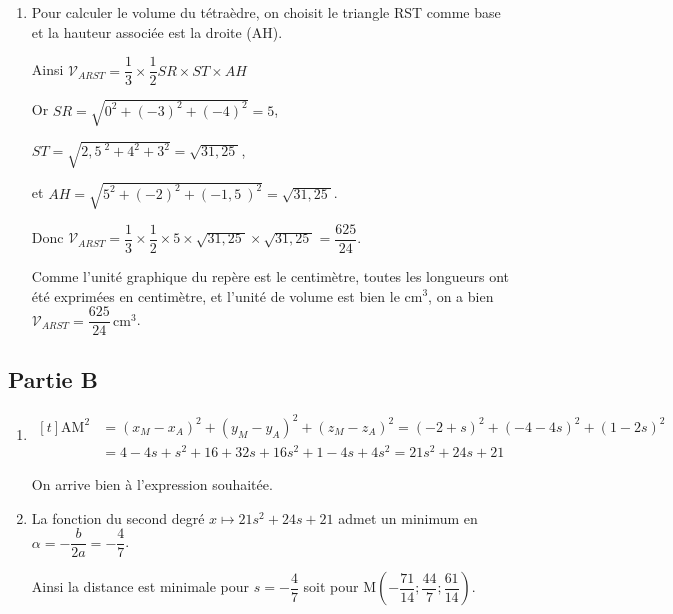 \documentclass[10pt]{article}
\providecommand{\vectt}[1]{\overrightarrow{\mathrm{#1}}}
\providecommand{\np}[2][]{{#2~#1}}
\begin{document}
\begin{enumerate}
\begin{enumerate}
			Les vecteurs $\vectt{SR}$ et $\vectt{ST}$ sont orthogonaux donc les droites (SR) et (ST) sont orthogonale (et perpendiculaires, car sécantes en S) et le triangle RST est rectangle en S.

			\item Pour calculer le volume du tétraèdre, on choisit le triangle RST comme base et la hauteur associée est la droite (AH).

			Ainsi \quad $\mathcal{V}_{ARST} = \dfrac{1}{3} \times \dfrac{1}{2} SR \times ST \times AH$

			Or \quad  $SR=\sqrt{0^2+(-3)^2+(-4)^2}=5$,

			$ST=\sqrt{\np{2,5}^2+4^2+3^2}=\sqrt{\np{31,25}}$,

			et \quad $AH=\sqrt{5^2+(-2)^2+(-\np{1,5})^2}=\sqrt{\np{31,25}}$.

			Donc \quad $\mathcal{V}_{ARST} = \dfrac{1}{3} \times \dfrac{1}{2} \times 5 \times \sqrt{\np{31,25}} \times \sqrt{\np{31,25}}=\dfrac{625}{24}$.

			Comme l'unité graphique du repère est le centimètre, toutes les longueurs ont été exprimées en centimètre, et l'unité de volume est bien le cm$^3$, on a bien $\mathcal{V}_{ARST} = \dfrac{625}{24} \,\text{cm}^3$.
		\end{enumerate}
	\end{enumerate}

	\subsection*{Partie B}

	\begin{enumerate}
		\item $\begin{aligned}[t]
			\mathrm{AM}^2&=\left(x_M-x_A \right)^2+\left(y_M-y_A \right)^2+\left(z_M-z_A \right)^2
		=( -2+s)^2+(-4-4s)^2+(1-2s)^2\\
		&=4-4s+s^2+16+32s+16s^2+1-4s+4s^2
		=21s^2+24s+21
		\end{aligned}$

		On arrive bien à l'expression souhaitée.

		\item La fonction du second degré \quad $x \longmapsto 21s^2+24s+21$ \quad admet un minimum en \quad $\alpha = -\dfrac{b}{2a}=-\dfrac{4}{7}$.

		Ainsi la distance est minimale pour \quad $s=-\dfrac{4}{7}$ \quad soit pour \quad  M$\left(-\dfrac{71}{14} ; \dfrac{44}{7} ; \dfrac{61}{14} \right)$.
	\end{enumerate}
\end{document}
